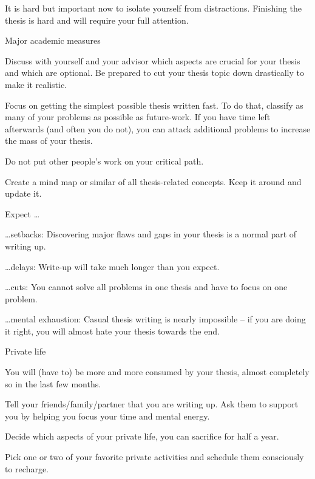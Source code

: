 \documentclass[12pt]{article}
\begin{document}
It is hard but important now to isolate yourself from distractions.
Finishing the thesis is hard and will require your full attention.
\begin{compactitem}
\item Major academic measures
\begin{compactitem}
\item Discuss with yourself and your advisor which aspects are crucial for your thesis and which are optional.
Be prepared to cut your thesis topic down drastically to make it realistic.
\item Focus on getting the simplest possible thesis written fast.
To do that, classify as many of your problems as possible as future-work.
If you have time left afterwards (and often you do not), you can attack additional problems to increase the mass of your thesis.
\item Do not put other people's work on your critical path.
\item Create a mind map or similar of all thesis-related concepts. Keep it around and update it.
\end{compactitem}
\item Expect \ldots
\begin{compactitem}
\item \ldots setbacks:
Discovering major flaws and gaps in your thesis is a normal part of writing up.
\item \ldots delays:
Write-up will take much longer than you expect.
\item \ldots cuts: You cannot solve all problems in one thesis and have to focus on one problem.
\item \ldots mental exhaustion: Casual thesis writing is nearly impossible -- if you are doing it right, you will almost hate your thesis towards the end.
\end{compactitem}
\item Private life
\begin{compactitem}
\item You will (have to) be more and more consumed by your thesis, almost completely so in the last few months.
\item Tell your friends/family/partner that you are writing up. Ask them to support you by helping you focus your time and mental energy.
\item Decide which aspects of your private life, you can sacrifice for half a year.
\item Pick one or two of your favorite private activities and schedule them consciously to recharge.

\end{compactitem}
\end{compactitem}
\end{document}
